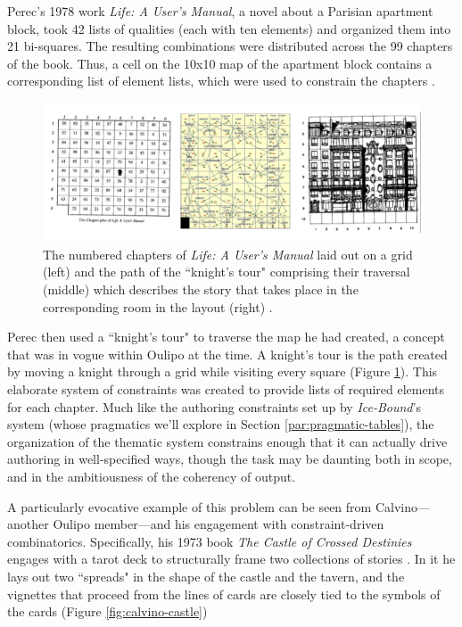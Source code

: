 Perec's 1978 work \textit{Life: A User's Manual}, a novel about a Parisian apartment block, took 42 lists of qualities (each with ten elements) and organized them into 21 bi-squares. The resulting combinations were distributed across the 99 chapters of the book. Thus, a cell on the 10x10 map of the apartment block contains a corresponding list of element lists, which were used to constrain the chapters \cite{bellos2010georges}.


\begin{figure}
    \centering
    \includegraphics[width=\textwidth]{figures/2-Ice-Bound/calvino-tables.png}
    \caption{The numbered chapters of \textit{Life: A User's Manual} laid out on a grid (left) and the path of the ``knight's tour" comprising their traversal (middle) which describes the story that takes place in the corresponding room in the layout (right) \cite{harding_2014}.}
    \label{fig:calvino-tables}
\end{figure}


Perec then used a ``knight's tour" to traverse the map he had created, a concept that was in vogue within Oulipo at the time. A knight's tour is the path created by moving a knight through a grid while visiting every square (Figure \ref{fig:calvino-tables}). This elaborate system of constraints was created to provide lists of required elements for each chapter. Much like the authoring constraints set up by \textit{Ice-Bound}'s system (whose pragmatics we'll explore in Section \ref{par:pragmatic-tables}), the organization of the thematic system constrains enough that it can actually drive authoring in well-specified ways, though the task may be daunting both in scope, and in the ambitiousness of the coherency of output.

A particularly evocative example of this problem can be seen from Calvino---another Oulipo member---and his engagement with constraint-driven combinatorics. Specifically, his 1973 book \textit{The Castle of Crossed Destinies} engages with a tarot deck to structurally frame two collections of stories \cite{crossed_destinies}. In it he lays out two ``spreads" in the shape of the castle and the tavern, and the vignettes that proceed from the lines of cards are closely tied to the symbols of the cards (Figure \ref{fig:calvino-castle})

